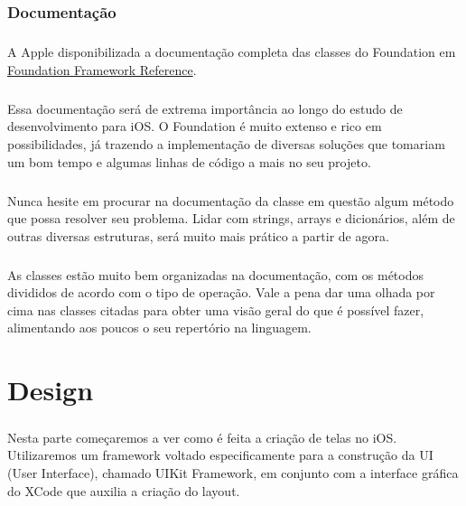 \documentclass[a4paper,12pt,brazil,doubleside]{book}
\begin{document}
\bigskip

\subsection{Documentação}

\paragraph{}A Apple disponibilizada a documentação completa das classes do Foundation em
\href{http://developer.apple.com/library/ios/#documentation/Cocoa/Reference/Foundation/ObjC_classic/_index.html}{Foundation Framework Reference}.
\paragraph{}Essa documentação será de extrema importância ao longo do estudo de desenvolvimento para iOS. O Foundation é muito extenso e rico em possibilidades, já trazendo a implementação de diversas soluções que tomariam um bom tempo e algumas linhas de código a mais no seu projeto.
\paragraph{}Nunca hesite em procurar na documentação da classe em questão algum método que possa resolver seu problema. Lidar com strings, arrays e dicionários, além de outras diversas estruturas, será muito mais prático a partir de agora.
\paragraph{}As classes estão muito bem organizadas na documentação, com os métodos divididos de acordo com o tipo de operação. Vale a pena dar uma olhada por cima nas classes citadas para obter uma visão geral do que é possível fazer, alimentando aos poucos o seu repertório na linguagem.


\bigskip
\bigskip


\chapter{Design}

\paragraph{}Nesta parte começaremos a ver como é feita a criação de telas no iOS. Utilizaremos um framework voltado especificamente para a construção da UI (User Interface), chamado UIKit Framework, em conjunto com a interface gráfica do XCode que auxilia a criação do layout.
\end{document}
